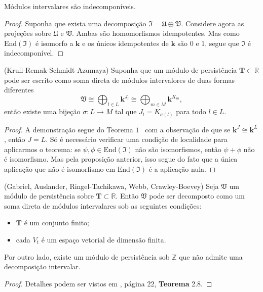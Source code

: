 \begin{propo}\label{prop:mod_int}
    Módulos intervalares são indecomponíveis. 
\end{propo}
\begin{proof}
    Suponha que exista uma decomposição $\mathfrak{I} = \mathfrak{U} \oplus \mathfrak{V}$. Considere agora
    as projeções sobre $\mathfrak{U}$ e $\mathfrak{V}$. Ambas são homomorfismos idempotentes. Mas como 
    $\text{End}(\mathfrak{I})$ é isomorfo a $\mathbf{k}$ e os únicos idempotentes de $\mathbf{k}$ são 
    $0$ e $1$, segue que $\mathfrak{I}$ é indecomponível. 
\end{proof}

\begin{teo}{(Krull-Remak-Schmidt-Azumaya)}\label{teo:krull}
    Suponha que um módulo de persistência $\mathbf{T} \subset \mathbb{R}$ pode ser escrito como soma 
    direta de módulos intervalores de duas formas diferentes
    \begin{equation*}
        \mathfrak{V} \cong \bigoplus_{l \in L} \mathbf{k}^{J_l} \cong \bigoplus_{m \in M} \mathbf{k}^{K_m},
    \end{equation*}
    então existe uma bijeção $\sigma \colon L \to M$ tal que $J_l = K_{\sigma(l)}$ para todo $l \in L$. 
\end{teo}
\begin{proof}
    A demonstração segue do Teorema $1$~\cite{Azumaya1950} com a observação de que se $\mathbf{k}^J \cong 
    \mathbf{k}^L$, então $J=L$. Só é necessário verificar uma condição de localidade para aplicarmos o teorema:
    se $\psi, \phi \in \text{End}(\mathfrak{I})$ não são isomorfismos, então $\psi + \phi$ não é isomorfismo. 
    Mas pela proposição anterior, isso segue do fato que a única aplicação que não é isomorfismo em 
    $\text{End}(\mathfrak{I})$ é a aplicação nula.
\end{proof}

\begin{teo}{(Gabriel, Auslander, Ringel-Tachikawa, Webb, Crawley-Boevey)}\label{teo:crawley}
    Seja $\mathfrak{V}$ um módulo de persistência sobre $\mathbf{T} \subset \mathbb{R}$. Então $\mathfrak{V}$
    pode ser decomposto como um soma direta de módulos intervalares sob as seguintes condições:
    \begin{itemize} 
        \item $\mathbf{T}$ é um conjunto finito;
        \item cada $V_t$ é um espaço vetorial de dimensão finita. 
    \end{itemize}
    Por outro lado, existe um módulo de persistência sob $\mathbb{Z}$ que não admite uma decomposição intervalar. 
\end{teo}  
\begin{proof}
    Detalhes podem ser vistos em \cite{Chazal2016}, página 22, \textbf{Teorema} 2.8.
\end{proof}

